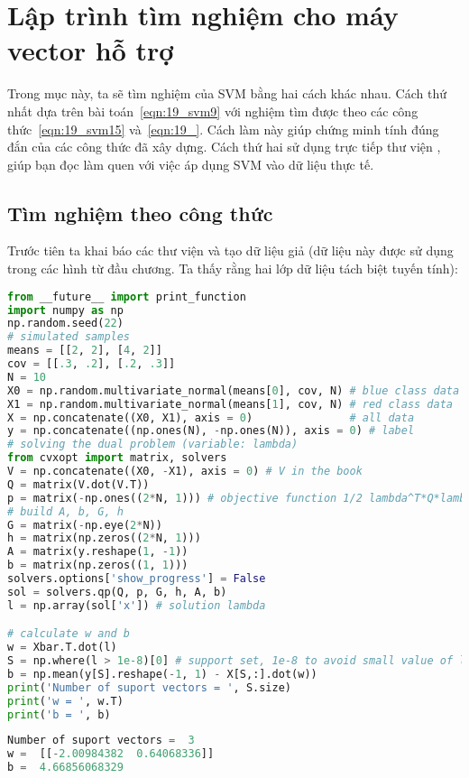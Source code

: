  
\section{Lập trình tìm nghiệm cho máy vector hỗ trợ}

Trong mục này, ta sẽ tìm nghiệm của SVM bằng hai cách khác nhau. Cách
thứ nhất dựa trên bài toán~\eqref{eqn:19_svm9} với nghiệm tìm được theo các công
thức~\eqref{eqn:19_svm15} và~\eqref{eqn:19_}. Cách làm này giúp chứng minh tính đúng đắn
của các công thức đã xây dựng. Cách thứ hai sử dụng trực tiếp
thư viện , giúp bạn đọc làm quen với việc áp dụng SVM vào dữ liệu thực tế. 
 
 
\subsection{Tìm nghiệm theo công thức }

Trước tiên ta khai báo các thư viện và tạo dữ liệu giả (dữ
liệu này được sử dụng trong các hình từ đầu chương. Ta thấy rằng hai lớp dữ liệu tách biệt tuyến tính):
\begin{lstlisting}[language=Python]
from __future__ import print_function 
import numpy as np 
np.random.seed(22)
# simulated samples 
means = [[2, 2], [4, 2]]
cov = [[.3, .2], [.2, .3]]
N = 10
X0 = np.random.multivariate_normal(means[0], cov, N) # blue class data 
X1 = np.random.multivariate_normal(means[1], cov, N) # red class data
X = np.concatenate((X0, X1), axis = 0)               # all data 
y = np.concatenate((np.ones(N), -np.ones(N)), axis = 0) # label 
# solving the dual problem (variable: lambda)
from cvxopt import matrix, solvers
V = np.concatenate((X0, -X1), axis = 0) # V in the book
Q = matrix(V.dot(V.T))
p = matrix(-np.ones((2*N, 1))) # objective function 1/2 lambda^T*Q*lambda - 1^T*lambda 
# build A, b, G, h 
G = matrix(-np.eye(2*N))
h = matrix(np.zeros((2*N, 1)))
A = matrix(y.reshape(1, -1)) 
b = matrix(np.zeros((1, 1))) 
solvers.options['show_progress'] = False
sol = solvers.qp(Q, p, G, h, A, b)
l = np.array(sol['x']) # solution lambda 

# calculate w and b 
w = Xbar.T.dot(l)
S = np.where(l > 1e-8)[0] # support set, 1e-8 to avoid small value of l.
b = np.mean(y[S].reshape(-1, 1) - X[S,:].dot(w))
print('Number of suport vectors = ', S.size)
print('w = ', w.T)
print('b = ', b)
\end{lstlisting} 
\kq
\begin{lstlisting}[language=Python]
Number of suport vectors =  3
w =  [[-2.00984382  0.64068336]]
b =  4.66856068329
\end{lstlisting}

